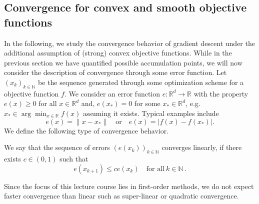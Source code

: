 \documentclass[12pt,openany]{book}
\theoremstyle{definition}
\theoremstyle{definition}
\newcommand{\N}{\mathbb{N}}
\newcommand{\R}{\mathbb{R}}
\begin{document}
\subsection{Convergence for convex and smooth objective functions}\label{sec:GD_convex}
In the following, we study the convergence behavior of gradient descent under the additional assumption of (strong) convex objective functions. While in the previous section we have quantified possible accumulation points, we will now consider the description of convergence through some error function.  Let $(x_k)_{k\in\N}$ be the sequence generated through some optimization scheme for a objective function $f$.  We consider an error function $e:\R^d\to\R$ with the property $e(x)\ge0$ for all $x\in\R^d$ and,  $e(x_\ast) = 0$ for some $x_\ast\in\R^d$, e.g.~$x_\ast \in\arg\min_{x\in\R} f(x)$ assuming it exists.  Typical examples include
\[e(x) = \|x-x_\ast\| \quad \text{or}\quad e(x) = |f(x)-f(x_\ast)|. \]
We define the following type of convergence behavior.

\begin{defi}
We say that the sequence of errors $(e(x_k))_{k\in\N}$ converges
linearly, if there exists $c\in(0,1)$ such that \[e(x_{k+1}) \le c e(x_k) \quad \text{for all}\ k\in\N\,.\]
\end{defi}
Since the focus of this lecture course lies in first-order methods, we do not expect faster convergence than linear such as super-linear or quadratic convergence.  
\end{document}
